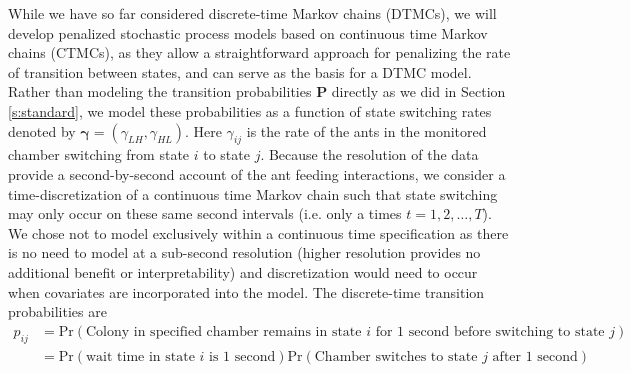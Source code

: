 \documentclass[smallextended]{svjour3}       %
\begin{document}
While we have so far considered discrete-time Markov chains (DTMCs), we will develop penalized stochastic process models based on continuous time Markov chains (CTMCs), as they allow a straightforward approach for penalizing the rate of transition between states, and can serve as the basis for a DTMC model. Rather than modeling the transition probabilities $\mathbf{P}$ directly as we did in Section \ref{s:standard}, we model these probabilities as a function of state switching rates denoted by $\bm{\gamma} = (\gamma_{LH}, \gamma_{HL})$. Here $\gamma_{ij}$ is the rate of the ants in the monitored chamber switching from state $i$ to state $j$. Because the resolution of the data provide a second-by-second account of the ant feeding interactions, we consider a time-discretization of a continuous time Markov chain such that state switching may only occur on these same second intervals (i.e. only a times $t = 1, 2, \dots, T$). We chose not to model exclusively within a continuous time specification as there is no need to model at a sub-second resolution (higher resolution provides no additional benefit or interpretability) and discretization would need to occur when covariates are incorporated into the model. The discrete-time transition probabilities are
\begin{equation}
\begin{aligned}
p_{ij} &=  \text{Pr}(
\text{Colony in specified chamber remains in state $i$ for 1 second before switching to state $j$})\\
    &= \text{Pr}(\text{wait time in state $i$ is 1 second})\text{Pr}(\text{Chamber switches to state $j$ after 1 second})\\
\end{aligned}
\label{e:pij}
\end{equation}
\end{document}
